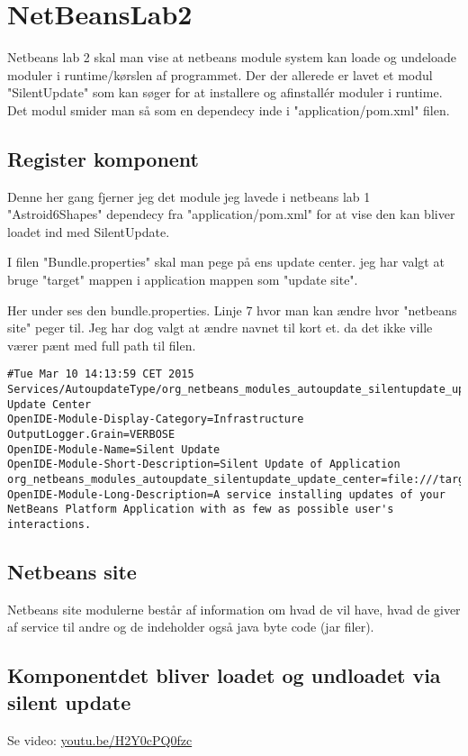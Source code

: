 \section{NetBeansLab2}
Netbeans lab 2 skal man vise at netbeans module system kan loade og undeloade
moduler i runtime/kørslen af programmet. Der der allerede er lavet et modul
"SilentUpdate" som kan søger for at installere og afinstallér moduler i
runtime. Det modul smider man så som en dependecy inde i "application/pom.xml"
filen.

\subsection{Register komponent}
Denne her gang fjerner jeg det module jeg lavede i netbeans lab 1
"Astroid6Shapes" dependecy fra "application/pom.xml" for at vise den kan bliver
loadet ind med SilentUpdate.


\hfill \linebreak \hline 
{}
\hline \hfill \linebreak

I filen "Bundle.properties" skal man pege på ens update center. jeg har valgt at 
bruge "target" mappen i application mappen som "update site". 

Her under ses den bundle.properties. Linje 7 hvor man kan ændre hvor "netbeans
site" peger til.  Jeg har dog valgt at ændre navnet til kort et. da det ikke
ville værer pænt med full path til filen.

\begin{lstlisting}[caption={Bundle.properties}, label={lst:App}]
#Tue Mar 10 14:13:59 CET 2015
Services/AutoupdateType/org_netbeans_modules_autoupdate_silentupdate_update_center.instance=Sample Update Center
OpenIDE-Module-Display-Category=Infrastructure
OutputLogger.Grain=VERBOSE
OpenIDE-Module-Name=Silent Update
OpenIDE-Module-Short-Description=Silent Update of Application
org_netbeans_modules_autoupdate_silentupdate_update_center=file:///target/netbeans_site/updates.xml
OpenIDE-Module-Long-Description=A service installing updates of your NetBeans Platform Application with as few as possible user's interactions.
\end{lstlisting}

\subsection{Netbeans site}
Netbeans site modulerne består af information om hvad de vil have, hvad de giver
af service til andre og de indeholder også java byte code (jar filer).

\subsection{Komponentdet bliver loadet og undloadet via silent update}
Se video: \href{https://www.youtube.com/watch?v=H2Y0cPQ0fzc}{youtu.be/H2Y0cPQ0fzc}


